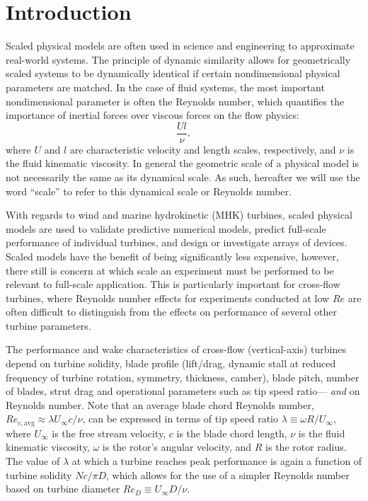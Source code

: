 \documentclass[energies,article,accept,moreauthors,pdftex,12pt,a4paper]{mdpi}
\begin{document}
\linenumbers


\section{Introduction}

Scaled physical models are often used in science and engineering to approximate
real-world systems. The principle of dynamic similarity allows for geometrically
scaled systems to be dynamically identical if certain nondimensional
physical parameters are matched. In the case of fluid systems, the most
important nondimensional parameter is often the Reynolds number, which
quantifies the importance of inertial forces over viscous forces on the flow
physics:
\begin{equation}
    \frac{Ul}{\nu},
    \label{eq:Re}
\end{equation}
where $U$ and $l$ are characteristic velocity and length scales, respectively,
and $\nu$ is the fluid kinematic viscosity. In general the geometric scale of a
physical model is not necessarily the same as its dynamical scale. As such,
hereafter we will use the word ``scale'' to refer to this dynamical scale or
Reynolds number.

With regards to wind and marine hydrokinetic (MHK) turbines, scaled physical
models are used to validate predictive numerical models, predict full-scale
performance of individual turbines, and design or investigate arrays of devices.
Scaled models have the benefit of being significantly less expensive, however,
there still is concern at which scale an experiment must be performed to be
relevant to full-scale application. This is particularly important for
cross-flow turbines, where Reynolds number effects for experiments conducted at
low $Re$ are often difficult to distinguish from the effects on performance of
several other turbine parameters.

The performance and wake characteristics of cross-flow (vertical-axis) turbines
depend on turbine solidity, blade profile (lift/drag, dynamic stall at reduced
frequency of turbine rotation, symmetry, thickness, camber), blade pitch, number
of blades, strut drag and operational parameters such as tip speed ratio---{\em
    and} on Reynolds number. Note that an average blade chord Reynolds number,
$Re_{c,\mathrm{avg}} \approx \lambda U_\infty c/ \nu$, can be expressed in terms
of tip speed ratio $\lambda \equiv \omega R/ U_\infty$, where $U_\infty$ is the
free stream velocity, $c$ is the blade chord length, $\nu$ is the fluid
kinematic viscosity, $\omega$ is the rotor's angular velocity, and $R$ is the
rotor radius. The value of $\lambda$ at which a turbine reaches peak performance
is again a function of turbine solidity $Nc/\pi D$, which allows for the use of
a simpler Reynolds number based on turbine diameter $Re_D \equiv U_\infty
D/\nu$. 
\end{document}
